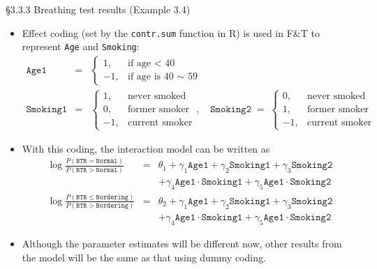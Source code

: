 \documentclass{beamer}
\begin{document}
\begin{frame}{\S3.3.3 Breathing test results  (Example 3.4)}
\begin{itemize}
\item
Effect coding (set by the \texttt{contr.sum} function in R) is used in F\&T  to represent \texttt{Age} and \texttt{Smoking}:
{\scriptsize
\begin{eqnarray*}
\texttt{Age1}&=& \left\{\begin{array}{cc} 1, & \mbox{if age < 40} \\ -1, & \mbox{if age is 40 $\sim$ 59}
\end{array}\right. \\
\texttt{Smoking1}&=&\left\{\begin{array}{cc} 1, & \mbox{never smoked} \\ 0, & \mbox{former smoker} \\ -1, & 
\mbox{current smoker} \end{array}\right., \quad
\texttt{Smoking2}\;=\; \left\{\begin{array}{cc} 0, & \mbox{never smoked} \\ 1, & \mbox{former smoker} \\ 
-1, & \mbox{current smoker}
\end{array}\right.
\end{eqnarray*}}
\item
With this coding, the interaction model can be written as {\scriptsize
\begin{eqnarray*}
\log\frac{P(\texttt{BTR}=\texttt{Normal})}{P(\texttt{BTR}>\texttt{Normal})}&=&\theta_1
+ \gamma_1\texttt{Age1}+\gamma_2\texttt{Smoking1}+\gamma_3\texttt{Smoking2} \\
&& + \gamma_4\texttt{Age1}\cdot \texttt{Smoking1}
+ \gamma_5\texttt{Age1}\cdot \texttt{Smoking2} \\
\log\frac{P(\texttt{BTR}\leq \texttt{Bordering})}{P(\texttt{BTR}>\texttt{Bordering})}&=&\theta_2
+ \gamma_1\texttt{Age1}+\gamma_2\texttt{Smoking1}+\gamma_3\texttt{Smoking2} \\
&& + \gamma_4\texttt{Age1}\cdot \texttt{Smoking1}
+ \gamma_5\texttt{Age1}\cdot \texttt{Smoking2} 
\end{eqnarray*}}
\item
Although the parameter estimates will be different now, other results from the model will be the
same as that using dummy coding.
\end{itemize}
\end{frame}
\end{document}
